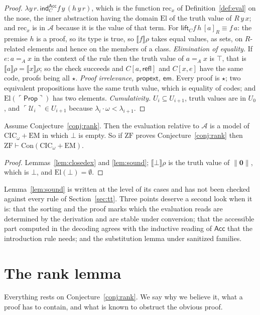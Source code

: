 \documentclass[10pt]{article}
\newcommand{\Prop}{\mathsf{Prop}}
\newcommand{\CIC}{\mathrm{CIC}}
\newcommand{\ZF}{\mathrm{ZF}}
\newcommand{\EM}{\mathrm{EM}}
\newcommand{\Con}{\mathrm{Con}}
\newcommand{\sem}[1]{\llbracket #1\rrbracket}
\newcommand{\El}{\mathrm{El}}
\newcommand{\code}[1]{\ulcorner #1\urcorner}
\newcommand{\U}{\mathcal{U}}
\newcommand{\A}{\mathcal{A}}
\newcommand{\ind}{\mathsf{ind}}
\newcommand{\Acc}{\mathsf{Acc}}
\newcommand{\refl}{\mathsf{refl}}
\begin{document}
\begin{proof}
$\lambda y\,r.\,\ind^{\Acc}_Cf\,y\,(h\,y\,r)$, which is the function
$\mathrm{rec}_x$ of Definition~\ref{def:eval} on the nose, the inner
abstraction having the domain $\El$ of the truth value of $R\,y\,x$; and
$\mathrm{rec}_x$ is in $\A$ because it is the value of that term. For
$\mathsf{lift}_Cf\,h\,[a]_R\equiv f\,a$: the premise $h$ is a proof, so
its type is true, so $\sem f\rho$ takes equal values, as sets, on
$R$-related elements and hence on the members of a class.
\emph{Elimination of equality.} If $e:a=_Ax$ in the context of the rule
then the truth value of $a=_Ax$ is $\top$, that is
$\sem a\rho=\sem x\rho$; so the check succeeds and
$C[a,\refl]$ and $C[x,e]$ have the same code, proofs being all $\star$.
\emph{Proof irrelevance, $\mathsf{propext}$, $\mathsf{em}$.} Every proof is
$\star$; two equivalent propositions have the same truth value, which
is equality of codes; and $\El(\code\Prop)$ has two elements.
\emph{Cumulativity.} $U_i\subseteq U_{i+1}$, truth values are in $U_0$,
and $\code{\U_i}\in U_{i+1}$ because $\lambda_i\cdot\omega<\lambda_{i+1}$.
\end{proof}

\begin{theorem}\label{thm:main}
Assume Conjecture~\ref{conj:rank}. Then the evaluation relative to $\A$ is
a model of $\CIC_\omega+\EM$ in which $\bot$ is empty. So if $\ZF$ proves
Conjecture~\ref{conj:rank} then $\ZF\vdash\Con(\CIC_\omega+\EM)$.
\end{theorem}
\begin{proof}
Lemmas~\ref{lem:closedex} and \ref{lem:sound}; $\sem\bot\rho$ is the
truth value of $\|\mathbf 0\|$, which is $\bot$, and $\El(\bot)=\emptyset$.
\end{proof}

Lemma~\ref{lem:sound} is written at the level of its cases and has not
been checked against every rule of Section~\ref{sec:tt}. Three points
deserve a second look when it is: that the sorting and the proof marks
which the evaluation reads are determined by the derivation and are
stable under conversion; that the accessible part computed in the
decoding agrees with the inductive reading of $\Acc$ that the
introduction rule needs; and the substitution lemma under sanitized
families.

\section{The rank lemma}\label{sec:ranklemma}

Everything rests on Conjecture~\ref{conj:rank}. We say why we believe
it, what a proof has to contain, and what is known to obstruct the
obvious proof.
\end{document}
